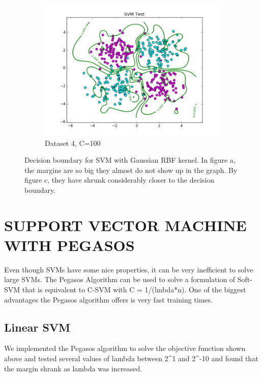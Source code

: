 \documentclass[10pt,twoside]{article}
\begin{document}
\begin{figure}[h]
\begin{subfigure}[b]{0.33\textwidth}
                \centering
                \includegraphics[width=\linewidth]{Figures/P2/RBF_data4_test_g1C100.png}
                \caption{Dataset 4, C=100}
        \end{subfigure}%
        \caption{Decision boundary for SVM with Gaussian RBF kernel. In figure a, the margins are so big they almost do not show up in the graph. By figure c, they have shrunk considerably closer to the decision boundary.}
\end{figure}



\section{\uppercase{Support Vector Machine with Pegasos}}

Even though SVMs have some nice properties, it can be very inefficient to solve large SVMs. The Pegasos Algorithm can be used to solve a formulation of Soft-SVM that is equivalent to C-SVM with C = 1/(lmbda*n). One of the biggest advantages the Pegasos algorithm offers is very fast training times. 

\subsection{Linear SVM}
We implemented the Pegasos algorithm to solve the objective function shown above and tested several values of lambda between 2^1 and 2^-10 and found that the margin shrank as lambda was increased. 
\end{document}

